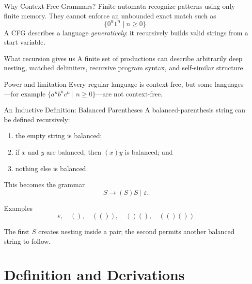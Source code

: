 \documentclass[10pt]{beamer}
\begin{document}
\begin{frame}{Why Context-Free Grammars?}
  Finite automata recognize patterns using only finite memory. They cannot enforce an unbounded
  exact match such as
  \[
    \{0^n1^n\mid n\ge0\}.
  \]
  A CFG describes a language \emph{generatively}: it recursively builds valid strings from a start
  variable.
  \pause
  \begin{block}{What recursion gives us}
    A finite set of productions can describe arbitrarily deep nesting, matched delimiters,
    recursive program syntax, and self-similar structure.
  \end{block}
  \pause
  \begin{alertblock}{Power and limitation}
    Every regular language is context-free, but some languages---for example
    $\{a^n b^n c^n\mid n\ge0\}$---are not context-free.
  \end{alertblock}
\end{frame}

\begin{frame}{An Inductive Definition: Balanced Parentheses}
  A balanced-parenthesis string can be defined recursively:
  \begin{enumerate}
    \item the empty string is balanced;
    \item if $x$ and $y$ are balanced, then $(x)y$ is balanced; and
    \item nothing else is balanced.
  \end{enumerate}
  \pause
  This becomes the grammar
  \[
    S\to (S)S\mid\varepsilon.
  \]
  \pause
  \begin{exampleblock}{Examples}
    \[
      \varepsilon,\quad (),\quad (()),\quad ()(),\quad (()())
    \]
  \end{exampleblock}
  The first $S$ creates nesting inside a pair; the second permits another balanced string to follow.
\end{frame}

\section{Definition and Derivations}
\end{document}
